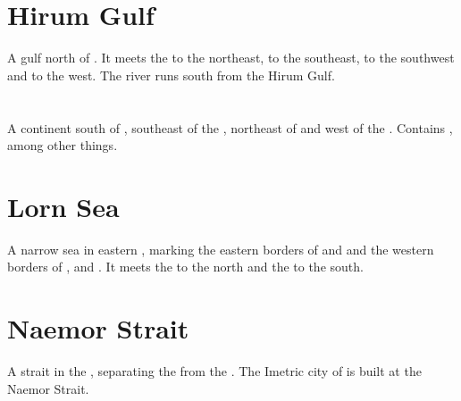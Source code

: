 \section{Hirum Gulf}
A gulf north of . 
It meets the  to the northeast,  to the southeast,  to the southwest and  to the west. 
The river  runs south from the Hirum Gulf. 















\section{\Durcaccontinent}
\index{\Durcaccontinent}
A continent south of , southeast of the , northeast of  and west of the . 
Contains , among other things. 
















\section{Lorn Sea}
A narrow sea in eastern , marking the eastern borders of  and  and the western borders of ,  and . It meets the  to the north and the  to the south. 
















\section{Naemor Strait}
A strait in the , separating the  from the . The Imetric city of  is built at the Naemor Strait. 

















